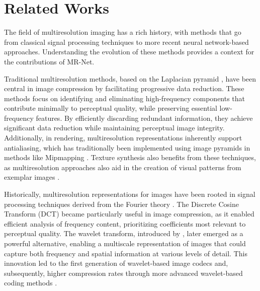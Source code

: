 


\section{Related Works}

The field of multiresolution imaging has a rich history, with methods that go from classical signal processing techniques to more recent neural network-based approaches. Understanding the evolution of these methods provides a context for the contributions of MR-Net.

Traditional multiresolution methods, based on the Laplacian pyramid \citep{burt1983laplacian}, have been central in image compression by facilitating progressive data reduction. These methods focus on identifying and eliminating high-frequency components that contribute minimally to perceptual quality, while preserving essential low-frequency features. By efficiently discarding redundant information, they achieve significant data reduction while maintaining perceptual image integrity. Additionally, in rendering, multiresolution representations inherently support antialiasing, which has traditionally been implemented using image pyramids in methods like Mipmapping \citep{mipmap83}. Texture synthesis also benefits from these techniques, as multiresolution approaches also aid in the creation of visual patterns from exemplar images \citep{thies19}.


Historically, multiresolution representations for images have been rooted in signal processing techniques derived from the Fourier theory \citep{bracewell1986fourier}. The Discrete Cosine Transform (DCT) \citep{dct-og} became particularly useful in image compression, as it enabled efficient analysis of frequency content, prioritizing coefficients most relevant to perceptual quality. The wavelet transform, introduced by \citet{mallat1989theory}, later emerged as a powerful alternative, enabling a multiscale representation of images that could capture both frequency and spatial information at various levels of detail. This innovation led to the first generation of wavelet-based image codecs \citep{antonini1992image} and, subsequently, higher compression rates through more advanced wavelet-based coding methods \citep{mallat-2gen}.

